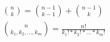 \begin{gather*}
  \binom{n}{k} = \binom{n - 1}{k - 1} + \binom{n - 1}{k} \\
  \binom{n}{k_1, k_2, ..., k_m} = \frac{n!}{k_1! * k_2! * ... * k_m!}
\end{gather*}
